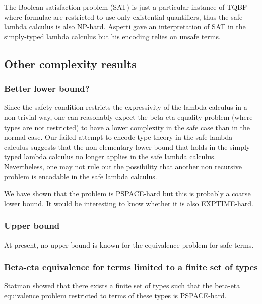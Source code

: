 \begin{remark}
The Boolean satisfaction problem (SAT) is just a particular instance of TQBF
where formulae are restricted to use only existential quantifiers, thus
the safe lambda calculus is also NP-hard. Asperti \cite{asperti-np} gave an interpretation of SAT in the simply-typed lambda calculus but his encoding relies on unsafe terms.
\end{remark}

\subsection{Other complexity results}




\subsubsection{Better lower bound?}
Since the safety condition restricts the expressivity of the lambda
calculus in a non-trivial way, one can reasonably expect the
beta-eta equality problem (where types are not restricted) to have a
lower complexity in the safe case than in the normal case. Our
failed attempt to encode type theory in the safe lambda calculus
suggests that the non-elementary lower bound that holds in the
simply-typed lambda calculus no longer applies in the safe lambda
calculus. Nevertheless, one may not rule out the possibility that
another non recursive problem is encodable in the safe lambda
calculus.

We have shown that the problem is PSPACE-hard but this is probably a coarse lower bound. It would be interesting to know
whether it is also EXPTIME-hard.

\subsubsection{Upper bound}
At present, no upper bound is known for the equivalence problem for safe terms.


\subsubsection{Beta-eta equivalence for terms limited to a finite set of types}
Statman showed \cite{Statman:1979:TLE} that there exists a finite
set of types such that the beta-eta equivalence problem restricted to terms
of these types is PSPACE-hard.

